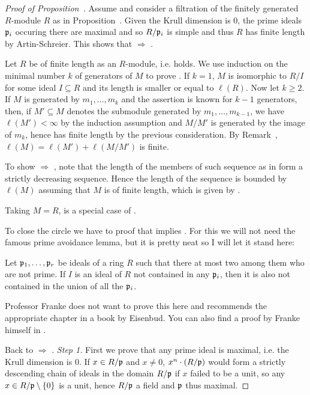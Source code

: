 \documentclass[a4paper,parskip=half,numbers=enddot, DIV=12]{scrreprt}
\begin{document}
\begin{proof}[Proof of Proposition~]
    Assume  and consider a filtration of the finitely generated $R$-module $R$ as in Proposition~. Given the Krull dimension is $0$, the prime ideals $\mathfrak{p}_i$ occuring there are maximal and so $R/\mathfrak{p}_i$ is simple and thus $R$ has finite length by Artin-Schreier. This shows that  $\Rightarrow$ .
    
    Let $R$ be of finite length as an $R$-module, i.e.  holds. We use induction on the minimal number $k$ of generators of $M$ to prove . If $k=1$, $M$ is isomorphic to $R/I$ for some ideal $I\subseteq R$ and its length is smaller or equal to $\ell(R)$. Now let $k\geq 2$. If $M$ is generated by $m_1,\ldots, m_k$ and the assertion is known for $k-1$ generators, then, if $M'\subseteq M$ denotes the submodule generated by $m_1,\ldots, m_{k-1}$, we have $\ell(M') < \infty$ by the induction assumption and $M/M'$ is generated by the image of $m_k$, hence has finite length by the previous consideration. By Remark~, $\ell(M)=\ell(M')+\ell(M/M')$ is finite.
    
    To show  $\Rightarrow$ , note that the length of the members of such sequence as in  form a strictly decreasing sequence. Hence the length of the sequence is bounded by $\ell(M)$ assuming that $M$ is of finite length, which is given by .
    
    Taking $M=R$,  is a special case of .
    
    To close the circle we have to proof that  implies . For this we will not need the famous prime avoidance lemma, but it is pretty neat so I will let it stand here:
    
    \begin{lem}
        Let $\mathfrak{p}_1,\ldots, \mathfrak{p}_r$ be ideals of a ring $R$ such that there at most two among them who are not prime. If $I$ is an ideal of $R$ not contained in any $\mathfrak{p}_i$, then it is also not contained in the union of all the $\mathfrak{p}_i$. 
    \end{lem}
    Professor Franke does not want to prove this here and recommends the appropriate chapter in a book by Eisenbud. You can also find a proof by Franke himself in \cite[Lemma~2.5.1]{alg1}.
    
    Back to  $\Rightarrow$ . \emph{Step 1.} First we prove that any prime ideal is maximal, i.e. the Krull dimension is $0$. If $x\in R/\mathfrak{p}$ and $x\neq 0$, $x^n\cdot(R/\mathfrak{p})$ would form a strictly descending chain of ideals in the domain $R/\mathfrak{p}$ if $x$ failed to be a unit, so any $x\in R/\mathfrak{p}\setminus\{0\}$ is a unit, hence $R/\mathfrak{p}$ a field and $\mathfrak{p}$ thus maximal. 
    

\end{proof}
\end{document}
